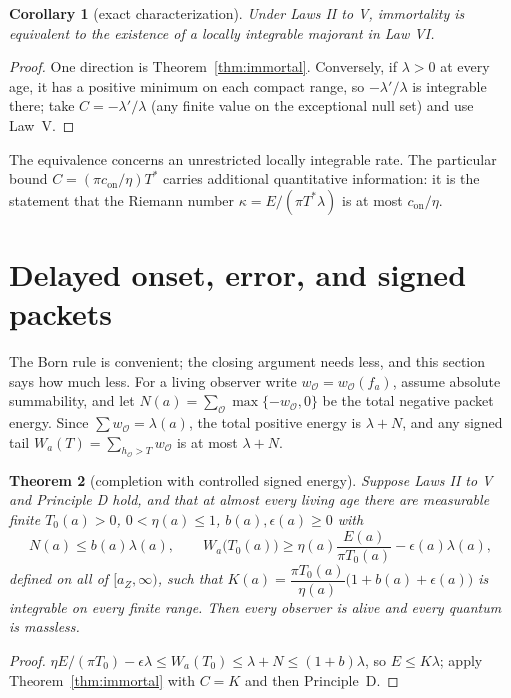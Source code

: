 \documentclass[11pt]{article}
\newtheorem{theorem}{Theorem}[section]
\newtheorem{corollary}[theorem]{Corollary}
\theoremstyle{definition}
\theoremstyle{remark}
\newcommand{\Tst}{T^{*}}
\newcommand{\con}{c_{\mathrm{on}}}
\begin{document}
\begin{corollary}[exact characterization]\label{cor:char}
Under Laws II to V, immortality is equivalent to the existence of a locally integrable majorant in Law VI.
\end{corollary}

\begin{proof}
One direction is Theorem~\ref{thm:immortal}. Conversely, if $\lambda>0$ at every age, it has a positive minimum on each compact range, so $-\lambda'/\lambda$ is integrable there; take $C=-\lambda'/\lambda$ (any finite value on the exceptional null set) and use Law~V.
\end{proof}

The equivalence concerns an unrestricted locally integrable rate. The particular bound $C=(\pi\con/\eta)\Tst$ carries additional quantitative information: it is the statement that the Riemann number $\kappa=E/(\pi\Tst\lambda)$ is at most $\con/\eta$.

\section{Delayed onset, error, and signed packets}

The Born rule is convenient; the closing argument needs less, and this section says how much less. For a living observer write $w_{\mathcal O}=w_{\mathcal O}(f_a)$, assume absolute summability, and let $N(a)=\sum_{\mathcal O}\max\{-w_{\mathcal O},0\}$ be the total negative packet energy. Since $\sum w_{\mathcal O}=\lambda(a)$, the total positive energy is $\lambda+N$, and any signed tail $W_a(T)=\sum_{h_{\mathcal O}>T}w_{\mathcal O}$ is at most $\lambda+N$.

\begin{theorem}[completion with controlled signed energy]\label{thm:signed}
Suppose Laws II to V and Principle D hold, and that at almost every living age there are measurable finite $T_0(a)>0$, $0<\eta(a)\le1$, $b(a),\epsilon(a)\ge0$ with
\[
N(a)\le b(a)\lambda(a),\qquad W_a\big(T_0(a)\big)\ge\eta(a)\frac{E(a)}{\pi T_0(a)}-\epsilon(a)\lambda(a),
\]
defined on all of $[a_Z,\infty)$, such that $K(a)=\dfrac{\pi T_0(a)}{\eta(a)}\big(1+b(a)+\epsilon(a)\big)$ is integrable on every finite range. Then every observer is alive and every quantum is massless.
\end{theorem}

\begin{proof}
$\eta E/(\pi T_0)-\epsilon\lambda\le W_a(T_0)\le\lambda+N\le(1+b)\lambda$, so $E\le K\lambda$; apply Theorem~\ref{thm:immortal} with $C=K$ and then Principle~D.
\end{proof}
\end{document}
